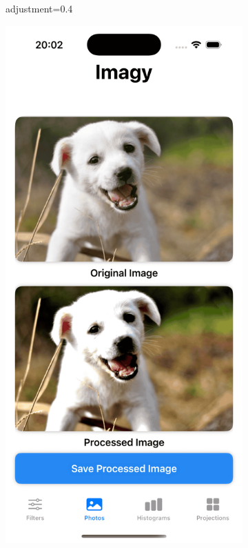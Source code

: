 \documentclass[a4paper]{article}
\begin{document}
\begin{figure}[H]
\begin{subfigure}{0.2\textwidth}
        \caption{adjustment=0.4}
        \label{fig:dog_contrast_0}
    \end{subfigure}
    \hfill
    \begin{subfigure}{0.2\textwidth}
        \centering
        \includegraphics[width=\linewidth]{images/dog_contrast_1.6.png}

\end{subfigure}
\end{figure}
\end{document}
